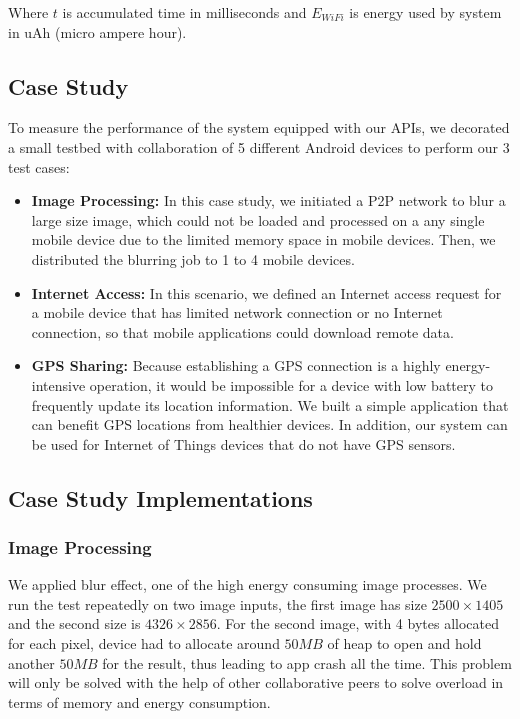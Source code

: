 \documentclass{sig-alternate}[10pt]
\begin{document}
\begin{CCSXML}
Where $t$ is accumulated time in milliseconds and $E_{WiFi}$ is energy used by system in uAh (micro ampere hour).

\subsection{Case Study}
To measure the performance of the system equipped with our APIs, we decorated a small testbed with collaboration of 5 different Android devices to perform our 3 test cases:
\begin{itemize}
	\item \textbf{Image Processing:} In this case study, we initiated a P2P network to blur a large size image, which could not be loaded and processed on a any single mobile device due to the limited memory space in mobile devices. Then, we distributed the blurring job to 1 to 4 mobile devices. 
	\item \textbf{Internet Access:} In this scenario, we defined an Internet access request for a mobile device that has limited network connection or no Internet connection, so that mobile applications could download remote data.
	\item \textbf{GPS Sharing:} Because establishing a GPS connection is a highly energy-intensive operation, it would be impossible for a device with low battery to frequently update its location information. We built a simple application that can benefit GPS locations from healthier devices. In addition, our system can be used for Internet of Things devices that do not have GPS sensors.
\end{itemize}

\subsection{Case Study Implementations}

\subsubsection{Image Processing}
We applied blur effect, one of the high energy consuming image processes. We run the test repeatedly on two image inputs, the first image has size $2500 \times 1405$ and the second size is $4326 \times 2856$. For the second image, with 4 bytes allocated for each pixel, device had to allocate around $50MB$ of heap to open and hold another $50MB$ for the result, thus leading to app crash all the time. This problem will only be solved with the help of other collaborative peers to solve overload in terms of memory and energy consumption.


\end{CCSXML}
\end{document}
